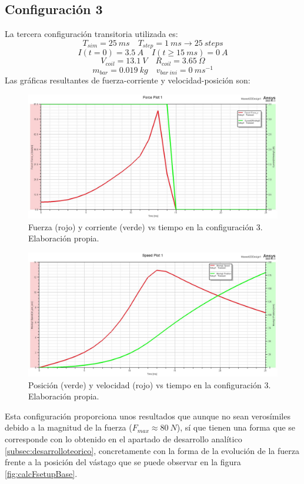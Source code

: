 \subsection*{Configuración 3}
La tercera configuración transitoria utilizada es:
\[
T_{sim}=25~ms \quad T_{step}=1~ms \to 25~steps
\]
\[
I(t=0)=3.5~A \quad I(t\geq 15~ms)=0~A
\]
\[
V_{coil}=13.1~V \quad R_{coil}=3.65~\Omega
\]
\[
m_{bar}=0.019~kg \quad v_{bar~ini}=0~ms^{-1}
\]
Las gráficas resultantes de fuerza-corriente y velocidad-posición son:
\begin{figure}[H]
    \centering
    \includegraphics[width=13cm]{FigurasMemoria/S3ForceCurrent.jpg}
    \caption{Fuerza (rojo) y corriente (verde) vs tiempo en la configuración 3. Elaboración propia.}
    \label{fig:S3ForceCurrent} %
\end{figure}
\begin{figure}[H]
    \centering
    \includegraphics[width=13cm]{FigurasMemoria/S3SpeedPos.jpg}
    \caption{Posición (verde) y velocidad (rojo) vs tiempo en la configuración 3. Elaboración propia.}
    \label{fig:S3SpeedPos} %
\end{figure}
Esta configuración proporciona unos resultados que aunque no sean verosímiles debido a la magnitud de la fuerza (\(F_{max}\approx 80~N\)), sí que tienen una forma que se corresponde con lo obtenido en el apartado de desarrollo analítico \ref{subsec:desarrolloteorico}, concretamente con la forma de la evolución de la fuerza frente a la posición del vástago que se puede observar en la figura \ref{fig:calcFsetupBase}. 

